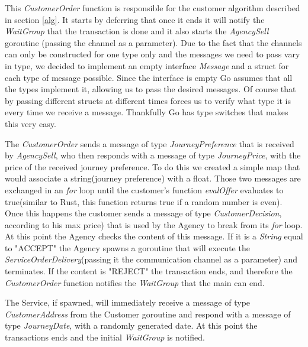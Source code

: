\documentclass[runningheads]{llncs}
\begin{document}
This {\it CustomerOrder} function is responsible for the customer algorithm described in section \ref{alg}. It starts by deferring that once it ends it will notify the {\it WaitGroup} that the transaction is done and it also starts the {\it AgencySell} goroutine (passing the channel as a parameter).
Due to the fact that the channels can only be constructed for one type only and the messages we need to pass vary in type, we decided to implement an empty interface {\it Message} and a struct for each type  of message possible. Since the interface is empty Go assumes that all the types implement it, allowing us to pass the desired messages. Of course that by passing different structs at different times forces us to verify what type it is every time we receive a message. Thankfully Go has type switches that makes this very easy.

The {\it CustomerOrder} sends a message of type {\it JourneyPreference} that is received by {\it AgencySell}, who then responds with a message of type {\it JourneyPrice}, with the price of the received journey preference. To do this we created a simple map that would associate a string(journey preference) with a float. Those two messages are exchanged in an {\it for} loop until the customer's function {\it evalOffer} evaluates to true(similar to Rust, this function returns true if a random number is even). Once this happens the customer sends a message of type {\it CustomerDecision}, according to his max price) that is used by the Agency to break from its {\it for} loop. At this point the Agency checks the content of this message. If it is a {\it String} equal to "ACCEPT" the Agency spawns a goroutine that will execute the {\it ServiceOrderDelivery}(passing it the communication channel as a parameter) and terminates. If the content is "REJECT" the transaction ends, and therefore the {\it CustomerOrder} function notifies the {\it WaitGroup} that the main can end.

The Service, if spawned, will immediately receive a message of type {\it CustomerAddress} from the Customer goroutine and respond with a message of type {\it JourneyDate}, with a randomly generated date. At this point the transactions ends and the initial {\it WaitGroup} is notified.
\end{document}
